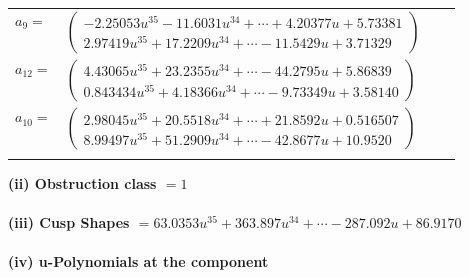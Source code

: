 \documentclass[1p]{elsarticle_modified}
\theoremstyle{definition}
\begin{document}
\begin{tabular}{m{7pt} m{180pt} m{7pt} m{180pt} }
\flushright $a_{9}=$&$\begin{pmatrix}-2.25053 u^{35}-11.6031 u^{34}+\cdots+4.20377 u+5.73381\\2.97419 u^{35}+17.2209 u^{34}+\cdots-11.5429 u+3.71329\end{pmatrix}$ \\
\flushright $a_{12}=$&$\begin{pmatrix}4.43065 u^{35}+23.2355 u^{34}+\cdots-44.2795 u+5.86839\\0.843434 u^{35}+4.18366 u^{34}+\cdots-9.73349 u+3.58140\end{pmatrix}$ \\
\flushright $a_{10}=$&$\begin{pmatrix}2.98045 u^{35}+20.5518 u^{34}+\cdots+21.8592 u+0.516507\\8.99497 u^{35}+51.2909 u^{34}+\cdots-42.8677 u+10.9520\end{pmatrix}$\\&\end{tabular}
\flushleft \textbf{(ii) Obstruction class $= 1$}\\~\\
\flushleft \textbf{(iii) Cusp Shapes $= 63.0353 u^{35}+363.897 u^{34}+\cdots-287.092 u+86.9170$}\\~\\
\newpage\renewcommand{\arraystretch}{1}
\flushleft \textbf{(iv) u-Polynomials at the component}\newline \\
\end{document}
